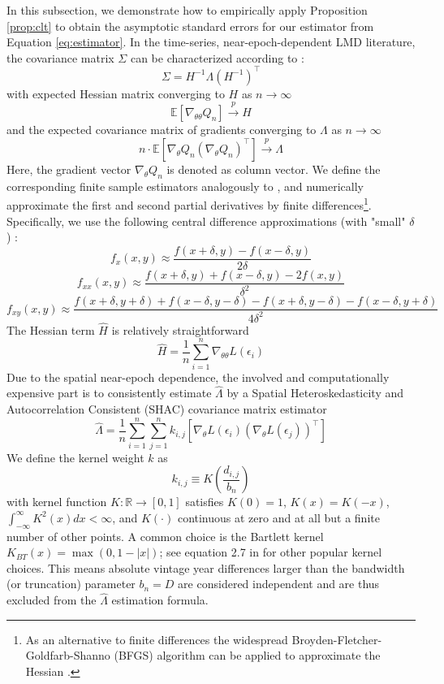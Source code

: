 \documentclass[12pt]{article}
\begin{document}
In this subsection, we demonstrate how to empirically apply Proposition \ref{prop:clt} to obtain the asymptotic standard errors for our estimator from Equation \ref{eq:estimator}.
In the time-series, near-epoch-dependent LMD literature, the covariance matrix ${\Sigma}$ can be characterized according to \citet[Theorem 11.2.b, Theorem H.1]{PP97}:
\[
{\Sigma} = H^{-1} \Lambda (H^{-1})^\top
\]
with expected Hessian matrix converging to $H$ as $n \to \infty$
\[
\mathbb{E}
\left[
\nabla_{\theta \theta} Q_n
\right]
\overset{p}{\to}
H
\]
and the expected covariance matrix of gradients converging to $\Lambda$ as $n \to \infty$
\[
n \cdot \mathbb{E}
\left[
\nabla_{\theta} Q_n
(\nabla_{\theta} Q_n)^\top
\right]
\overset{p}{\to}
\Lambda
\]
Here, the gradient vector $\nabla_{\theta} Q_n$ is denoted as column vector.
We define the corresponding finite sample estimators analogously to \citet[Chapters 12, 13.1]{PP97}, and numerically approximate the first and second partial derivatives by finite differences\footnote{As an alternative to finite differences the widespread Broyden-Fletcher-Goldfarb-Shanno (BFGS) algorithm can be applied to approximate the Hessian \cite[Section 6.1]{NW06}.}.
Specifically, we use the following central difference approximations (with "small" $\delta$) \cite[Algorithm 2]{E17}:
\[
f_{x}(x,y) \approx \frac{f(x+\delta,y) - f(x-\delta,y)}{2\delta}
\]
\[
f_{xx}(x,y) \approx \frac{f(x+\delta,y) + f(x-\delta,y) - 2  f(x,y)}{\delta^2}
\]
\[
f_{xy}(x,y) \approx \frac{f(x+\delta,y+\delta) + f(x-\delta,y-\delta) -  f(x+\delta,y-\delta) - f(x-\delta,y+\delta)}{4\delta^2}
\]
The Hessian term $\hat{H}$ is relatively straightforward
\[
\hat{H} = \frac{1}{n} \sum_{i=1}^n \nabla_{\theta \theta} L \left( \epsilon_i \right)
\]
Due to the spatial near-epoch dependence, the involved and computationally expensive part is to consistently estimate $\hat{\Lambda}$ by a Spatial Heteroskedasticity and Autocorrelation Consistent (SHAC) covariance matrix estimator \cite[Equation 2]{KS11}
\begin{equation}
\label{eq:hac}
\hat{\Lambda} = \frac{1}{n} \sum_{i=1}^n \sum_{j=1}^n
k_{i,j}
\left[
\nabla_{\theta} L \left( \epsilon_i \right)
\left(
\nabla_{\theta} L \left( \epsilon_j \right)
\right)^\top
\right]
\end{equation}
We define the kernel weight $k$ as
\[
k_{i,j} \equiv K \left( \frac{d_{i,j}}{b_n} \right)
\]
with kernel function $K: \mathbb{R} \to [0,1]$ satisfies $K(0)=1$, $K(x)=K(-x)$, $\int_{-\infty}^{\infty} K^2(x) dx < \infty$, and $K(\cdot)$ continuous at zero and at all but a finite number of other points.
A common choice is the Bartlett kernel $K_{BT}(x)= \max(0, 1-|x|)$; see equation 2.7 in \cite{A91} for other popular kernel choices.
This means absolute vintage year differences larger than the bandwidth (or truncation) parameter $b_n=D$ are considered independent and are thus excluded from the $\hat{\Lambda}$ estimation formula.
\end{document}
